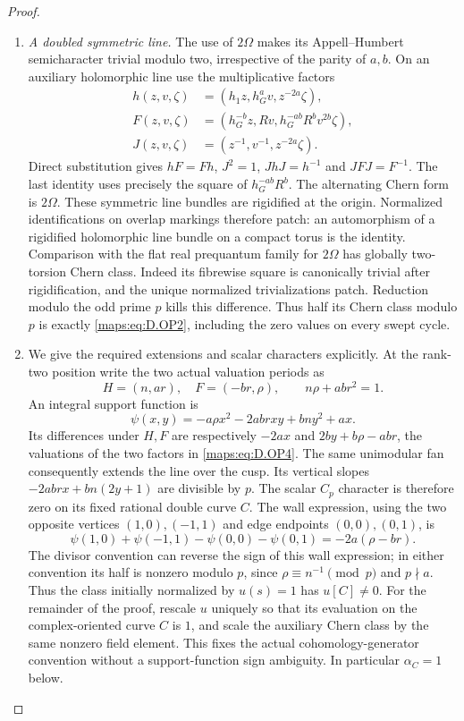 \begin{proof}
\begin{enumerate}[label=\arabic*.,leftmargin=*]
\item \emph{A doubled symmetric line.}
The use of $2\Omega$ makes its Appell--Humbert semicharacter
trivial modulo two, irrespective of the parity of $a,b$.
On an auxiliary holomorphic line use the multiplicative factors
\[
\begin{aligned}
 h(z,v,\zeta)&=(h_1z,h_G^a v,z^{-2a}\zeta),\\
 F(z,v,\zeta)&=(h_G^{-b}z,Rv,
                         h_G^{-ab}R^b v^{2b}\zeta),\\
 J(z,v,\zeta)&=(z^{-1},v^{-1},z^{-2a}\zeta).
\end{aligned}                                                    \tag{D.OP4}\label{maps:eq:D.OP4}
\]
Direct substitution gives $hF=Fh$, $J^2=1$, $JhJ=h^{-1}$
and $JFJ=F^{-1}$. The last identity uses precisely the square
of $h_G^{-ab}R^b$. The alternating Chern form is $2\Omega$.
These symmetric line bundles are rigidified at the origin.
Normalized identifications on overlap markings therefore patch:
an automorphism of a rigidified holomorphic line bundle on a
compact torus is the identity. Comparison with the flat real
prequantum family for $2\Omega$ has globally two-torsion Chern
class. Indeed its fibrewise square is canonically trivial after
rigidification, and the unique normalized trivializations patch.
Reduction modulo the odd prime $p$ kills this difference. Thus
half its Chern class modulo $p$ is exactly \eqref{maps:eq:D.OP2}, including
the zero values on every swept cycle.

\item We give the required extensions and scalar characters explicitly.
At the rank-two position write the two actual valuation periods as
\[
 H=(n,ar),\quad F=(-br,\rho),\qquad n\rho+ab r^2=1.
\]
An integral support function is
\[
 \psi(x,y)=-a\rho x^2-2ab rxy+bn y^2+ax.
 \tag{D.OP5}\label{maps:eq:D.OP5}
\]
Its differences under $H,F$ are respectively
$-2ax$ and $2by+b\rho-ab r$, the valuations of the
two factors in \eqref{maps:eq:D.OP4}. The same unimodular fan consequently
extends the line over the cusp. Its vertical slopes
$-2ab rx+bn(2y+1)$ are divisible by $p$.
The scalar $C_p$ character is therefore zero on its fixed
rational double curve $C$. The wall expression, using the two
opposite vertices $(1,0),(-1,1)$ and edge endpoints
$(0,0),(0,1)$, is
\[
 \psi(1,0)+\psi(-1,1)-\psi(0,0)-\psi(0,1)
                         =-2a(\rho-br).
 \tag{D.OP6}\label{maps:eq:D.OP6}
\]
The divisor convention can reverse the sign of this wall
expression; in either convention its half is nonzero modulo
$p$, since $\rho\equiv n^{-1}\pmod p$ and $p\nmid a$.
Thus the class initially normalized by $u(s)=1$ has
$u[C]\ne0$. For the remainder of the proof, rescale $u$
uniquely so that its evaluation on the complex-oriented
curve $C$ is $1$, and scale the auxiliary Chern class by
the same nonzero field element. This fixes the actual
cohomology-generator convention without a support-function
sign ambiguity. In particular $\alpha_C=1$ below.


\end{enumerate}
\end{proof}
